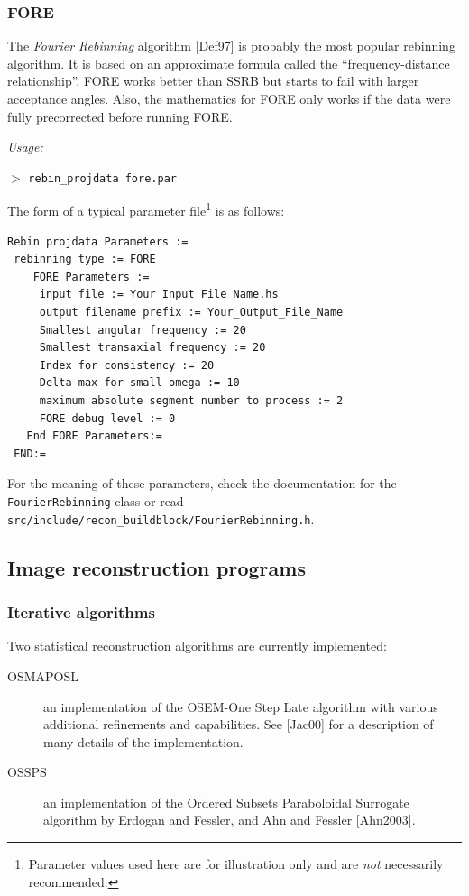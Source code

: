 \documentclass{article}
\newcommand{\cmdline}[1]{\par \noindent $>$ \texttt{#1}\par}
\begin{document}
\subsubsection{
FORE}
\label{sec:FORE}
The \textit{Fourier Rebinning} algorithm [Def97] is probably the most popular
rebinning algorithm. It is based on an approximate formula called the
``frequency-distance relationship''. FORE works better than SSRB but starts
to fail with larger acceptance angles. Also, the mathematics
for FORE only works if the data were fully precorrected before running FORE.

\textit{Usage:}

\cmdline{rebin\_projdata fore.par}

The form of a typical parameter file\footnote{Parameter values used here are for
illustration only and are \textit{not} necessarily recommended.} is as follows:

{\small 
\begin{verbatim}
Rebin projdata Parameters :=
 rebinning type := FORE
    FORE Parameters :=
     input file := Your_Input_File_Name.hs
     output filename prefix := Your_Output_File_Name
     Smallest angular frequency := 20
     Smallest transaxial frequency := 20
     Index for consistency := 20
     Delta max for small omega := 10
     maximum absolute segment number to process := 2
     FORE debug level := 0
   End FORE Parameters:=
 END:=
\end{verbatim}
}
For the meaning of these parameters, check the documentation for the
\texttt{FourierRebinning} class or read
\texttt{src/include/recon\_buildblock/FourierRebinning.h}.

\subsection{
Image reconstruction programs}
\label{sec:imagereconstructionprograms}



\subsubsection{
Iterative algorithms}

Two statistical reconstruction algorithms are currently implemented:
\begin{description}
\item[OSMAPOSL] an implementation 
of the OSEM-One Step Late algorithm with various additional refinements 
and capabilities. See [Jac00] for a description of many details of the
implementation.
\item[OSSPS] an implementation of the Ordered Subsets Paraboloidal
Surrogate algorithm by Erdogan and Fessler, and Ahn and Fessler [Ahn2003]. 
\end{description}
\end{document}
